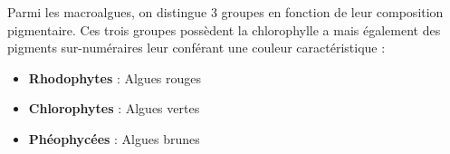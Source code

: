 \documentclass[
]{book}
\begin{document}
Parmi les macroalgues, on distingue 3 groupes en fonction de leur composition pigmentaire. Ces trois groupes possèdent la chlorophylle a mais également des pigments sur-numéraires leur conférant une couleur caractéristique :

\begin{itemize}
\item
  \textbf{Rhodophytes} : Algues rouges
\item
  \textbf{Chlorophytes} : Algues vertes
\item
  \textbf{Phéophycées} : Algues brunes
\end{itemize}

  
\end{document}
